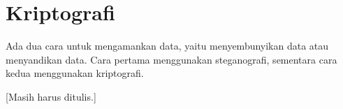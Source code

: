 \chapter{Kriptografi}
Ada dua cara untuk mengamankan data, yaitu menyembunyikan data atau menyandikan data. Cara pertama menggunakan steganografi, sementara cara kedua menggunakan kriptografi.

[Masih harus ditulis.]
